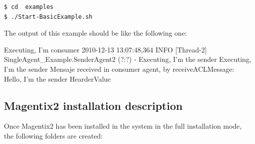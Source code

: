 \begin{verbatim}
$ cd  examples
$ ./Start-BasicExample.sh
\end{verbatim}

The output of this example should be like the following one:

\begin{codigo}
 Executing, I'm consumer
2010-12-13 13:07:48,364 INFO  
[Thread-2] SingleAgent_Example.SenderAgent2 (?:?) - 
        Executing, I'm the sender
Executing, I'm the sender
Mensaje received in consumer agent,
 by receiveACLMessage: Hello, I'm the sender
HearderValue
\end{codigo}



\subsection{Magentix2 installation description}\label{sec:InstallMagentix2DistDirectory}
Once Magentix2 has been installed in the system in the full installation mode, the following folders are created:
